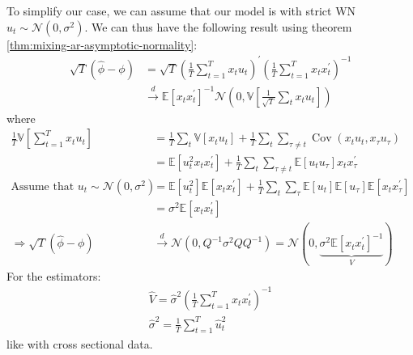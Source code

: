 To simplify our case, we can assume that our model is with strict WN $u_t \sim \mathcal{N}(0, \sigma^2)$.
We can thus have the following result using theorem \ref{thm:mixing-ar-asymptotic-normality}:
\begin{align*}
    \sqrt{T}(\hat{\phi} - \phi) &= \sqrt{T} \left( \frac{1}{T} \sum_{t=1}^{T} x_t u_t \right)^{\prime} \left( \frac{1}{T} \sum_{t=1}^{T} x_t x_t^{\prime} \right)^{-1} \\
    & \overset{d}{\rightarrow} \mathbb{E}[x_t x_t^{\prime}]^{-1} \mathcal{N} \left(0, \mathbb{V}\left[\frac{1}{\sqrt{T}} \sum_{t} x_t u_t \right]\right)
\end{align*}
where
\begin{align*}
    \frac{1}{T} \mathbb{V}\left[\sum_{t=1}^{T} x_t u_t\right] &= \frac{1}{T} \sum_{t} \mathbb{V}[x_t u_t] + \frac{1}{T} \sum_{t} \sum_{\tau \neq t} \operatorname{Cov}(x_t u_t, x_\tau u_\tau) \\
    &= \mathbb{E}[u_{t}^2 x_t x_t^{\prime}] + \frac{1}{T} \sum_{t} \sum_{\tau \neq t} \mathbb{E}[u_t u_{\tau}] x_t x_{\tau}^{\prime} \\
    \text{Assume that } u_t \sim \mathcal{N}(0, \sigma^2)
    &= \mathbb{E}[u_t^2] \mathbb{E}[x_t x_t^{\prime}] + \frac{1}{T} \sum_{t} \sum_{\tau} \mathbb{E}[u_t] \mathbb{E}[u_{\tau}] \mathbb{E}[x_t x_{\tau}^{\prime}] \\
    &= \sigma^2 \mathbb{E}[x_t x_t^{\prime}] \\
    \Rightarrow \sqrt{T}(\hat{\phi} - \phi) &\overset{d}{\rightarrow} \mathcal{N} \left(0, Q^{-1} \sigma^2 Q Q^{-1} \right) = \mathcal{N}\left(0, \underset{V}{\underbrace{\sigma^2 \mathbb{E}[x_t x_t^{\prime}]^{-1}}} \right)
\end{align*}
For the estimators:
\begin{gather*}
    \hat{V} = \hat{\sigma}^2 \left( \frac{1}{T} \sum_{t=1}^{T} x_t x_t^{\prime} \right)^{-1} \\
    \hat{\sigma}^2 = \frac{1}{T} \sum_{t=1}^{T} \hat{u}_t^2
\end{gather*}
like with cross sectional data.

